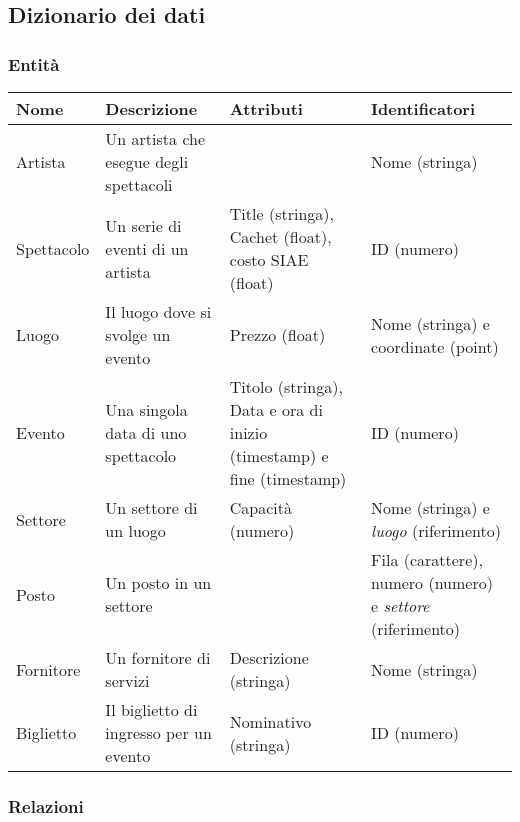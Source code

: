 \documentclass[a4paper,11pt]{article}
\begin{document}

\subsection{Dizionario dei dati}

\subsubsection*{Entità}

\begin{tabularx}{\textwidth}{|X|>{\raggedright\arraybackslash}X|>{\raggedright\arraybackslash}X|>{\raggedright\arraybackslash}X|}
\hline
\textbf{Nome} & \textbf{Descrizione} & \textbf{Attributi} & \textbf{Identificatori}\\
\hline
Artista & Un artista che esegue degli spettacoli & & Nome (stringa)\\
\hline
Spettacolo & Un serie di eventi di un artista & Title (stringa), Cachet (float), costo SIAE (float) & ID (numero)\\
\hline
Luogo & Il luogo dove si svolge un evento & Prezzo (float) & Nome (stringa) e coordinate (point)\\
\hline
Evento & Una singola data di uno spettacolo & Titolo (stringa), Data e ora di inizio (timestamp) e fine (timestamp) & ID (numero)\\
\hline
Settore & Un settore di un luogo & Capacità (numero) & Nome (stringa) e \textit{luogo} (riferimento)\\
\hline
Posto & Un posto in un settore & & Fila (carattere), numero (numero) e \textit{settore} (riferimento)\\
\hline
Fornitore & Un fornitore di servizi & Descrizione (stringa) & Nome (stringa)\\
\hline
Biglietto & Il biglietto di ingresso per un evento & Nominativo (stringa) & ID (numero)\\
\hline
\end{tabularx}

\subsubsection*{Relazioni}
\end{document}
